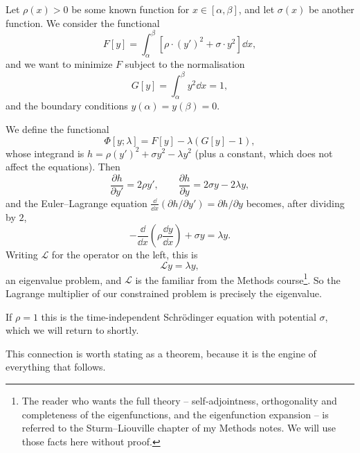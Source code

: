 \begin{example}
	Let $\rho(x) > 0$ be some known function for $x \in [\alpha, \beta]$, and let $\sigma(x)$ be another function. We consider the functional
	$$
	F[y] = \int_{\alpha}^{\beta} \left[\rho \cdot (y')^2 + \sigma \cdot y^2\right] \dd x,
	$$
	and we want to minimize $F$ subject to the normalisation
	$$
	G[y] = \int_\alpha^{\beta} y^2 \dd x = 1,
	$$
	and the boundary conditions $y(\alpha) = y(\beta) = 0$.

	We define the functional
	$$
	\Phi[y; \lambda] = F[y] - \lambda \left(G[y] - 1\right),
	$$
	whose integrand is $h = \rho (y')^2 + \sigma y^2 - \lambda y^2$ (plus a constant, which does not affect the equations). Then
	$$
	\frac{\partial h}{\partial y'} = 2\rho y', \qquad \frac{\partial h}{\partial y} = 2\sigma y - 2\lambda y,
	$$
	and the Euler--Lagrange equation $\frac{\dd}{\dd x}(\partial h/\partial y') = \partial h /\partial y$ becomes, after dividing by $2$,
	$$
	-\frac{\dd}{\dd x}\left(\rho \frac{\dd y}{\dd x}\right) + \sigma y = \lambda y.
	$$
	Writing $\mathcal{L}$ for the operator on the left, this is
	$$
	\mathcal{L}y = \lambda y,
	$$
	an eigenvalue problem, and $\mathcal{L}$ is the  familiar from the Methods course\footnote{The reader who wants the full theory -- self-adjointness, orthogonality and completeness of the eigenfunctions, and the eigenfunction expansion -- is referred to the Sturm--Liouville chapter of my Methods notes. We will use those facts here without proof.}. So the Lagrange multiplier of our constrained problem is precisely the eigenvalue.

	If $\rho = 1$ this is the time-independent Schr\"odinger equation with potential $\sigma$, which we will return to shortly.
\end{example}

This connection is worth stating as a theorem, because it is the engine of everything that follows.

